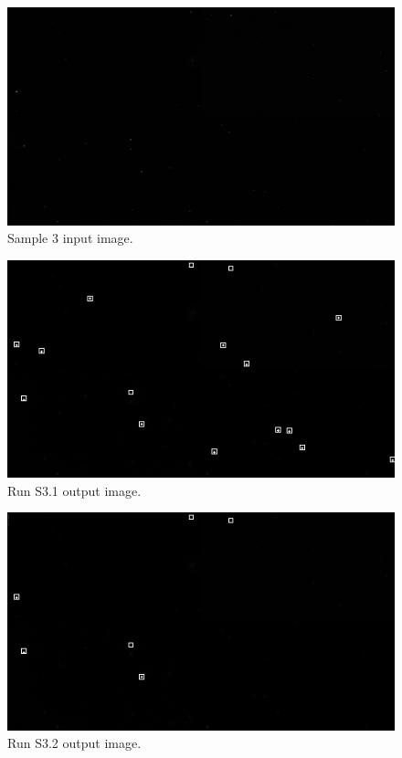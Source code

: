 \documentclass[12pt]{report}
\begin{document}
\begin{figure}[h]
    \centering
    \includegraphics[scale=1.2]{results/s2_in.png}
    \caption{Sample 3 input image.}
    \label{res:s2_in}
\end{figure}
\begin{figure}[h]
    \centering
    \includegraphics[scale=1.2]{results/s2_1.png}
    \caption{Run S3.1 output image.}
    \label{res:s2_1}
\end{figure}
\begin{figure}[h]
    \centering
    \includegraphics[scale=1.2]{results/s2_2.png}
    \caption{Run S3.2 output image.}
    \label{res:s2_2}
\end{figure}
\end{document}
